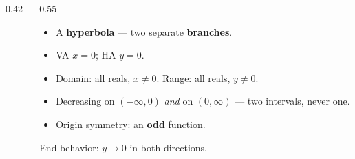 \documentclass[aspectratio=169, 11pt]{beamer}
\newcommand{\lgrid}[4]{%
  \draw[step=1, linegray!45, thin] (#1,#3) grid (#2,#4);
  \draw[->, thick, charcoal] (#1,0)--(#2,0) node[below right, font=\tiny]{$x$};
  \draw[->, thick, charcoal] (0,#3)--(0,#4) node[left, font=\tiny]{$y$};}
\begin{document}
\begin{frame}[t, plain]
  \begin{columns}[T]
    \begin{column}{0.42\textwidth}
      \centering
    \end{column}
    \begin{column}{0.55\textwidth}
      \begin{itemize}\setlength{\itemsep}{3pt}
        \item A \textbf{hyperbola} --- two separate \textbf{branches}.
        \item VA $x=0$; \; HA $y=0$.
        \item Domain: all reals, $x\neq0$. \; Range: all reals, $y\neq0$.
        \item Decreasing on $(-\infty,0)$ \emph{and} on $(0,\infty)$ --- two intervals, never one.
        \item Origin symmetry: an \textbf{odd} function.
      \end{itemize}
      \vspace{3pt}
      {\footnotesize End behavior: $y\to0$ in both directions.}
    \end{column}
  \end{columns}
\end{frame}
\end{document}
